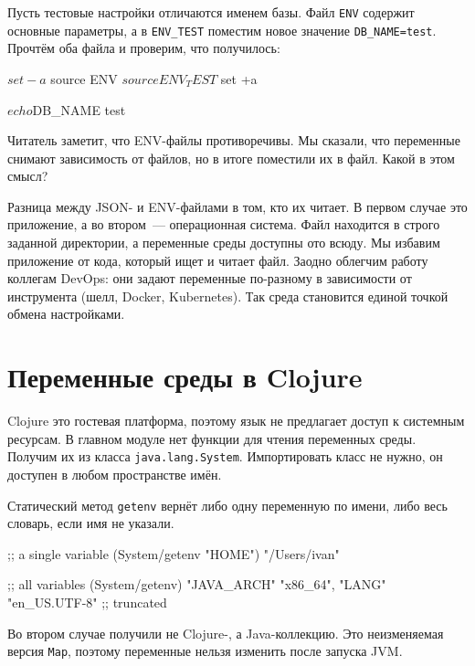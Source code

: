 Пусть тестовые настройки отличаются именем базы. Файл \verb|ENV| содержит
основные параметры, а в \verb|ENV_TEST| поместим новое значение
\verb|DB_NAME=test|. Прочтём оба файла и проверим, что получилось:

\begin{english}
  \begin{bash}
$ set -a
$ source ENV
$ source ENV_TEST
$ set +a

$ echo $DB_NAME
test
  \end{bash}
\end{english}

Читатель заметит, что ENV-файлы противоречивы. Мы сказали, что переменные
снимают зависимость от файлов, но в итоге поместили их в файл. Какой в этом
смысл?


Разница между JSON- и ENV-файлами в том, кто их читает. В первом случае это
приложение, а во втором~--- операционная система. Файл находится в строго
заданной директории, а переменные среды доступны ото всюду. Мы избавим
приложение от кода, который ищет и читает файл. Заодно облегчим работу коллегам
DevOps: они задают переменные по-разному в зависимости от инструмента (шелл,
Docker, Kubernetes). Так среда становится единой точкой обмена настройками.

\section{Переменные среды в Clojure}


Clojure это гостевая платформа, поэтому язык не предлагает доступ к системным
ресурсам. В главном модуле нет функции для чтения переменных среды. Получим их
из класса \verb|java.lang.System|. Импортировать класс не нужно, он доступен в
любом пространстве имён.

Статический метод \verb|getenv| вернёт либо одну переменную по имени, либо
весь словарь, если имя не указали.

\begin{english}
  \begin{clojure}
;; a single variable
(System/getenv "HOME")
"/Users/ivan"

;; all variables
(System/getenv)
{"JAVA_ARCH" "x86_64", "LANG" "en_US.UTF-8"} ;; truncated
  \end{clojure}
\end{english}

Во втором случае получили не Clojure-, а Java-коллекцию. Это неизменяемая версия
\verb|Map|, поэтому переменные нельзя изменить после запуска JVM.


